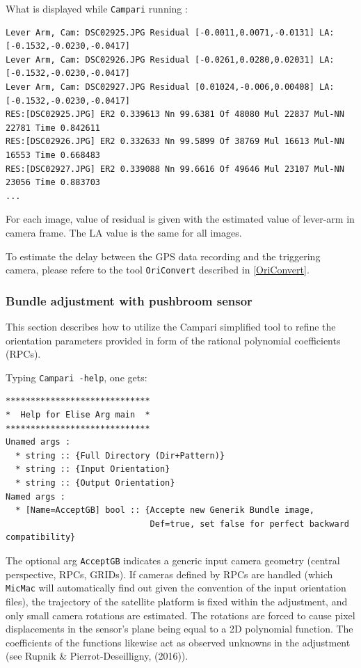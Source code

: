 \vspace{\baselineskip}
What is displayed while {\tt Campari} running :
\begin{verbatim}
Lever Arm, Cam: DSC02925.JPG Residual [-0.0011,0.0071,-0.0131] LA: [-0.1532,-0.0230,-0.0417]
Lever Arm, Cam: DSC02926.JPG Residual [-0.0261,0.0280,0.02031] LA: [-0.1532,-0.0230,-0.0417]
Lever Arm, Cam: DSC02927.JPG Residual [0.01024,-0.006,0.00408] LA: [-0.1532,-0.0230,-0.0417]
RES:[DSC02925.JPG] ER2 0.339613 Nn 99.6381 Of 48080 Mul 22837 Mul-NN 22781 Time 0.842611
RES:[DSC02926.JPG] ER2 0.332633 Nn 99.5899 Of 38769 Mul 16613 Mul-NN 16553 Time 0.668483
RES:[DSC02927.JPG] ER2 0.339088 Nn 99.6616 Of 49646 Mul 23107 Mul-NN 23056 Time 0.883703
...
\end{verbatim}

For each image, value of residual is given with the estimated value of lever-arm in camera frame. The LA value is the same
for all images.

\vspace{\baselineskip}
To estimate the delay between the GPS data recording and the triggering camera,
please refere to the tool {\tt OriConvert} described in \ref{OriConvert}.

\subsubsection{Bundle adjustment with pushbroom sensor}\label{subsub:rpcCampari}
This section describes how to utilize the Campari simplified tool to refine the orientation parameters provided in form of the rational polynomial coefficients (RPCs). 

\vspace{\baselineskip}
Typing {\tt Campari -help}, one gets:

\begin{verbatim}
*****************************
*  Help for Elise Arg main  *
*****************************
Unamed args :
  * string :: {Full Directory (Dir+Pattern)}
  * string :: {Input Orientation}
  * string :: {Output Orientation}
Named args :
  * [Name=AcceptGB] bool :: {Accepte new Generik Bundle image, 
                             Def=true, set false for perfect backward compatibility} 
\end{verbatim}

The optional arg \texttt{AcceptGB} indicates a generic input camera geometry (central perspective, RPCs, GRIDs). If cameras defined by RPCs are handled (which \texttt{MicMac} will automatically find out given the convention of the input orientation files), the trajectory of the satellite platform is fixed within the adjustment, and only small camera rotations are estimated. The rotations are forced to cause pixel displacements in the sensor's plane being equal to a 2D polynomial function. The coefficients of the functions likewise act as observed unknowns in the adjustment (see Rupnik \& Pierrot-Deseilligny, (2016)). 

